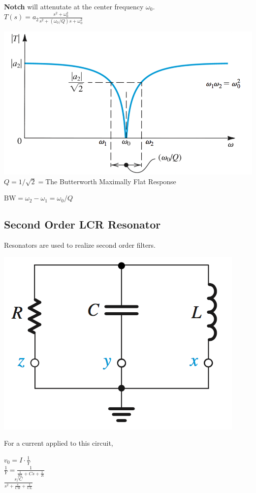 \documentclass[11pt]{article}
\begin{document}
    \textbf{Notch} will attenutate at the center frequency $\omega_0$. \\

    $T(s) = a_2\frac{s^2+\omega_{0}^2}{s^2 + (\omega_0/Q)s + \omega_{0}^2}$

    \includegraphics[width=\textwidth]{notch} 
    \\

    $Q = 1/\sqrt{2} = $The Butterworth Maximally Flat Response

    $\text{BW} = \omega_2 - \omega_1 = \omega_0/Q$

    \subsection{Second Order LCR Resonator}

    Resonators are used to realize second order filters.
    
    \begin{center}
        \includegraphics[width=250 px]{resonator} 
    \end{center}    

    For a current applied to this circuit,

    \begin{center}
        $v_0 = I \cdot \frac{1}{Y}$ \\
        
        $\frac{1}{Y} = \frac{1}{\frac{1}{SL} + Cs + \frac{1}{R}}$ \\
                
        $\frac{s/C}{s^2+\frac{s}{CR}+\frac{1}{CL}}$
    \end{center}
\end{document}
